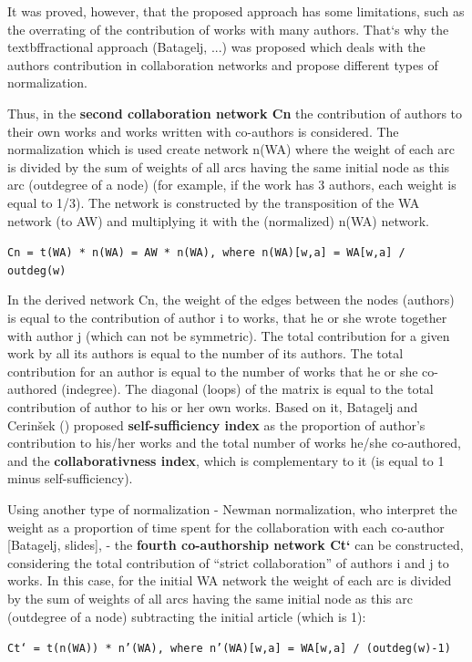 \documentclass[11pt]{article} %
\begin{document}
It was proved, however, that the proposed approach has some limitations, such as the overrating of the contribution of works with many authors. That`s why the textbf{fractional approach} (Batagelj, ...) was proposed which deals with the authors contribution in collaboration networks and propose different types of normalization. \medskip 

Thus, in the \textbf{second collaboration network Cn} the contribution of authors to their own works and works written with co-authors is considered. The normalization which is used create network n(WA) where the weight of each arc is divided by the sum of weights of all arcs having the same initial node as this arc (outdegree of a node) (for example, if the work has 3 authors, each weight is equal to 1/3). The network is constructed by the transposition of the WA network (to AW) and multiplying it with the (normalized) n(WA) network.\medskip 

\texttt{Cn = t(WA) * n(WA) = AW * n(WA), where n(WA)[w,a] = WA[w,a] / outdeg(w)} \medskip 

In the derived network Cn, the weight of the edges between the nodes (authors) is equal to the contribution of author i to works, that he or she wrote together with author j (which can not be symmetric). The total contribution for a given work by all its authors is equal to the number of its authors. The total contribution for an author is equal to the number of works that he or she co-authored (indegree). The diagonal (loops) of the matrix is equal to the total contribution of author to his or her own works. Based on it, Batagelj and Cerinšek () proposed \textbf{self-sufficiency index} as the proportion of author's contribution to his/her works and the total number of works he/she co-authored, and the \textbf{collaborativness index}, which is complementary to it (is equal to 1 minus self-sufficiency). \medskip 

Using another type of normalization - Newman normalization, who interpret the weight as a proportion of time spent for the collaboration with each co-author [Batagelj, slides], - the \textbf{fourth co-authorship network Ct`} can be constructed, considering the total contribution of “strict collaboration” of authors i and j to works. In this case, for the initial WA network the weight of each arc is divided by the sum of weights of all arcs having the same initial node as this arc (outdegree of a node) subtracting the initial article (which is 1): \medskip 

\texttt{Ct` = t(n(WA)) * n’(WA), where n’(WA)[w,a] = WA[w,a] / (outdeg(w)-1)} 
\end{document}
